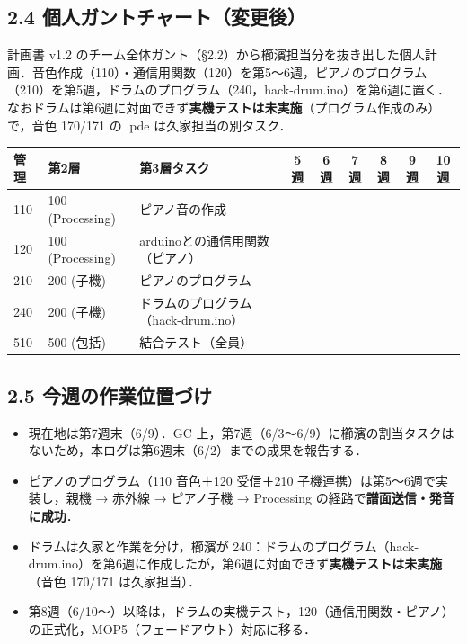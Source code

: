 \documentclass[a4paper,11pt]{ltjsarticle}
\providecommand{\％}{\%}
\begin{document}
\subsection*{2.4 個人ガントチャート（変更後）}

計画書 v1.2 のチーム全体ガント（§2.2）から櫛濱担当分を抜き出した個人計画．音色作成（110）・通信用関数（120）を第5〜6週，ピアノのプログラム（210）を第5週，ドラムのプログラム（240，hack-drum.ino）を第6週に置く．なおドラムは第6週に対面できず\textbf{実機テストは未実施}（プログラム作成のみ）で，音色 170/171 の .pde は久家担当の別タスク．

\begin{longtable}{|p{0.9cm}|p{2.0cm}|p{6.0cm}|c|c|c|c|c|c|}
\hline
\rowcolor[gray]{0.9}
管理 & 第2層 & 第3層タスク & 5週 & 6週 & 7週 & 8週 & 9週 & 10週 \\
\hline
110 & 100 (Processing) & ピアノ音の作成 & \cellcolor{ganttCell} & \cellcolor{ganttCell} & & & & \\
\hline
120 & 100 (Processing) & arduinoとの通信用関数（ピアノ） & \cellcolor{ganttCell} & \cellcolor{ganttCell} & & & & \\
\hline
210 & 200 (子機) & ピアノのプログラム & \cellcolor{ganttCell} & & & & & \\
\hline
240 & 200 (子機) & ドラムのプログラム（hack-drum.ino） & & \cellcolor{ganttCell} & & & & \\
\hline
510 & 500 (包括) & 結合テスト（全員） & & & & & \cellcolor{ganttCell} & \cellcolor{ganttCell} \\
\hline
\end{longtable}

\subsection*{2.5 今週の作業位置づけ}

\begin{itemize}
    \item 現在地は第7週末（6/9）．GC 上，第7週（6/3〜6/9）に櫛濱の割当タスクはないため，本ログは第6週末（6/2）までの成果を報告する．
    \item ピアノのプログラム（110 音色＋120 受信＋210 子機連携）は第5〜6週で実装し，親機 → 赤外線 → ピアノ子機 → Processing の経路で\textbf{譜面送信・発音に成功}．
    \item ドラムは久家と作業を分け，櫛濱が 240：ドラムのプログラム（hack-drum.ino）を第6週に作成したが，第6週に対面できず\textbf{実機テストは未実施}（音色 170/171 は久家担当）．
    \item 第8週（6/10〜）以降は，ドラムの実機テスト，120（通信用関数・ピアノ）の正式化，MOP5（フェードアウト）対応に移る．
\end{itemize}
\end{document}
